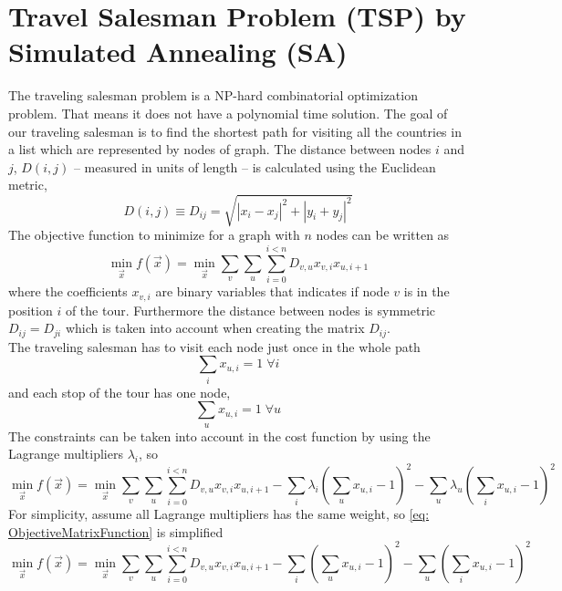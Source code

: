 \section{Travel Salesman Problem (TSP) by Simulated Annealing (SA)}
The traveling salesman problem is a NP-hard combinatorial optimization problem. That means it does not have a polynomial time solution. The goal of our traveling salesman is to find the shortest path for visiting all the countries in a list which are represented by nodes of graph. The distance between nodes $i$ and $j$, $D(i,j)$ -- measured in units of length -- is calculated using the Euclidean metric,
\begin{equation}
    D(i,j) \equiv D_{ij}= \sqrt{\left|x_{i} - x_{j}\right|^{2} + \left|y_{i} + y_{j} \right|^{2}} 
\end{equation}
The objective function to minimize for a graph with $n$ nodes can be written as
\begin{equation}
\label{eq:TSP_noconstraints}
    \min_{\vec{x}} f(\vec{x}) = \min_{\vec{x}} \sum_{v} \sum_{u} \sum_{i=0}^{i<n}D_{v,u}x_{v,i}x_{u, i+1}
\end{equation}
where the coefficients $x_{v,i}$ are binary variables that indicates if node $v$ is in the position $i$ of the tour. Furthermore the distance between nodes is symmetric $D_{ij} = D_{ji}$ which is taken into account when creating the matrix $D_{ij}$.\\
The traveling salesman has to visit each node just once in the whole path
\begin{equation}
    \sum_{i}x_{u,i} = 1 \; \forall i
\end{equation}
and each stop of the tour has one node,
\begin{equation}
    \sum_{u}x_{u, i} = 1 \; \forall u
\end{equation}
The constraints can be taken into account in the cost function by using the Lagrange multipliers $\lambda_{i}$, so
\begin{equation}
    \label{eq: ObjectiveMatrixFunction}
   \min_{\vec{x}} f(\vec{x}) = \min_{\vec{x}} \sum_{v} \sum_{u} \sum_{i=0}^{i<n}D_{v,u}x_{v,i}x_{u, i+1} - \sum_{i}\lambda_{i}\left(\sum_{u} x_{u, i} - 1\right)^{2} - \sum_{u}\lambda_{u} \left( \sum_{i}x_{u,i} - 1\right)^{2}
\end{equation}
For simplicity, assume all Lagrange multipliers has the same weight, so \ref{eq: ObjectiveMatrixFunction} is simplified 
\begin{equation}
    \min_{\vec{x}} f(\vec{x}) = \min_{\vec{x}} \sum_{v} \sum_{u} \sum_{i=0}^{i<n}D_{v,u}x_{v,i}x_{u, i+1} - \sum_{i}\left(\sum_{u} x_{u, i} - 1\right)^{2} - \sum_{u}\left( \sum_{i}x_{u,i} - 1\right)^{2} 
\end{equation}
